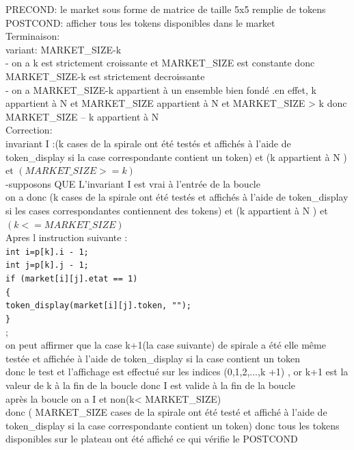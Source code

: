 \documentclass{article}
\begin{document}
\begin{tcolorbox}[colback=gray!10,colframe=black,title=preuve par terminaison et la correction d'un programme]
PRECOND: le market sous forme de matrice de taille 5x5 remplie de tokens\\
POSTCOND: afficher tous les tokens disponibles dans le market\\
Terminaison:\\
    variant: MARKET\_SIZE-k\\
    - on a k est strictement croissante et MARKET\_SIZE est constante donc MARKET\_SIZE-k est strictement decroissante\\
    - on a MARKET\_SIZE-k appartient à un ensemble bien fondé .en effet, k appartient à N et MARKET\_SIZE appartient à N et MARKET\_SIZE > k donc MARKET\_SIZE – k appartient à N\\
Correction:\\
    invariant  I :(k cases de la spirale ont été testés et affichés à l'aide de   token\_display si la case correspondante contient un token) et (k appartient à N ) et $( MARKET\_SIZE>=k)$\\
 
    -supposons QUE L'invariant I est vrai à l'entrée de la boucle \\
    on a donc (k cases de la spirale ont été testés  et affichés à l'aide de   token\_display si les cases correspondantes contiennent des tokens) et (k appartient à N ) et $(k<=MARKET\_SIZE)$\\
Apres l instruction suivante :\\
\texttt{int i=p[k].i - 1;}\\
\texttt{int j=p[k].j - 1;}\\
\texttt{if (market[i][j].etat == 1)}\\
    \texttt{\{}\\
      \texttt{token\_display(market[i][j].token, "");}\\
\texttt{\}}\\
;\\
on peut affirmer que la case k+1(la case suivante) de spirale a été elle même testée et affichée à l'aide de   token\_display si la case contient un token\\
    donc le test et l’affichage est effectué sur les indices (0,1,2,...,k +1) , or  k+1 est la valeur de k à la fin de la boucle  donc  I est valide à la fin de la boucle \\
 
    après la boucle on a       I et non(k< MARKET\_SIZE)\\
    donc    ( MARKET\_SIZE cases de la spirale ont été testé et affiché à l'aide de   token\_display si la case correspondante contient un token) donc tous les tokens disponibles sur le plateau ont été affiché  ce qui vérifie le POSTCOND
\end{tcolorbox}
\end{document}
